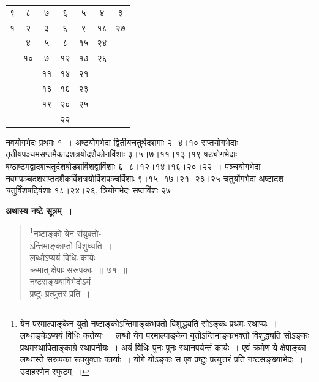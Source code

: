 \documentclass[11pt, openany]{book}
\begin{document}
\begin{center}
\begin{tabular}{|c|c|c|c|c|c|c|}
\cline{1-7}
{\hbox{९}} & {\hbox{८}} & {\hbox{७}} & {\hbox{६}} & {\hbox{५}} & {\hbox{४}} & {\hbox{३}}\\
\cline{1-7}
{\hbox{१}} & {\hbox{२}} & {\hbox{३}} & {\hbox{६}} & {\hbox{९}} & {\hbox{१८}} & {\hbox{२७}}\\
\cline{1-7}
\multicolumn{1}{c|}{} & {\hbox{४}} & {\hbox{५}} & {\hbox{८}} & {\hbox{१५}} & {\hbox{२४}} & \multicolumn{1}{c}{}\\
\cline{2-6}
\multicolumn{1}{c|}{} & {\hbox{१०}} & {\hbox{७}} & {\hbox{१२}} & {\hbox{१७}} & {\hbox{२६}} & \multicolumn{1}{c}{}\\
\cline{2-6}

\multicolumn{1}{c}{} & \multicolumn{1}{c|}{}  &  {\hbox{११}} & {\hbox{१४}} & {\hbox{२१}} & \multicolumn{1}{c}{}  & \multicolumn{1}{c}{} \\ \cline{3-5}

\multicolumn{1}{c}{} & \multicolumn{1}{c|}{}  &  {\hbox{१३}} & {\hbox{१६}} & {\hbox{२३}} & \multicolumn{1}{c}{}  & \multicolumn{1}{c}{} \\ \cline{3-5}

\multicolumn{1}{c}{} & \multicolumn{1}{c|}{}  &  {\hbox{१९}} & {\hbox{२०}} & {\hbox{२५}} & \multicolumn{1}{c}{}  & \multicolumn{1}{c}{} \\ \cline{3-5}

\multicolumn{1}{c}{} & \multicolumn{1}{c}{}  &  \multicolumn{1}{c|}{} & {\hbox{२२}} & \multicolumn{1}{c}{} & \multicolumn{1}{c}{}  & \multicolumn{1}{c}{} \\ \cline{4-4}
\end{tabular}
\end{center}

नवयोगभेदः प्रथमः १~। अष्टयोगभेदा द्वितीयचतुर्थदशमाः २।४।१० सप्तयोगभेदाः तृतीयपञ्चमसप्तमैकादशत्रयोदशैकोनविंशाः ३।५।७।११।१३।१९ षड्योगभेदाः षष्ठाष्टमद्वादशचतुर्दशषोडशविंशद्वाविंशाः ६।८।१२।१४।१६।२०।२२~। पञ्चयोगभेदा नवमपञ्चदशसप्तदशैकविंशत्रयोविंशपञ्चविंशाः ९।१५।१७।२१।२३।२५ चतुर्योगभेदा अष्टादश चतुर्विंशषट्विंशाः १८।२४।२६, त्रियोगभेदः सप्तविंशः २७~।

\newpage

\textbf{अथास्य नष्टे सूत्रम्~।}

\begin{quote}
\renewcommand{\thefootnote}{१}\footnote{येन परमाल्पाङ्केन युतो नष्टाङ्कोऽन्तिमाङ्कभक्तो विशुद्ध्यति सोऽङ्कः प्रथमः स्थाप्यः~। लब्धाङ्केऽप्ययं विधिः कर्तव्यः~। लब्धो येन परमाल्पाङ्केन युतोऽन्तिमाङ्कभक्तो विशुद्ध्यति सोऽङ्कः प्रथमस्थापिताङ्काग्रे स्थापनीयः~। अयं विधिः पुनः पुनः स्थानपर्यन्तं कार्यः~। एवं क्रमेण ये क्षेपाङ्का लब्धास्ते सरूपका रूपयुक्ताः कार्याः~। योगे योऽङ्कः स एव प्रष्टुः प्रत्युत्तरं प्रति नष्टसङ्ख्याभेदः~। उदाहरणेन स्फुटम्~।}{\gk नष्टाङ्को येन संयुक्तो-\\
ऽन्तिमाङ्काप्तो विशुध्यति~।\\
लब्धोऽप्ययं विधिः कार्यः\\
क्रमात् क्षेपाः सरूपकाः~॥~७१~॥\\
नष्टसङ्ख्याविभेदोऽयं\\
प्रष्टुः प्रत्युत्तरं प्रति~।}
\end{quote}
\end{document}
